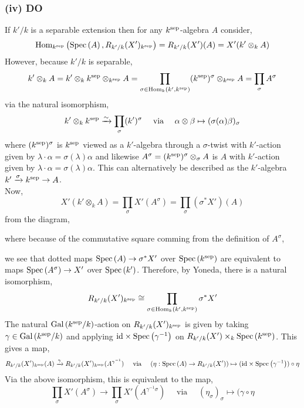 \documentclass[12pt]{article}
\begin{document}
\subsubsection{(iv) DO}

If $k'/k$ is a separable extension then for any $k^{\mathrm{sep}}$-algebra $A$ consider,
\[ \mathrm{Hom}_{k^{\mathrm{sep}}} \left( \mathrm{Spec}\left( A \right), R_{k'/k}(X')_{k^{\mathrm{sep}}} \right) = R_{k'/k}(X')(A) =  X'(k' \otimes_k A) \]
However, because $k'/k$ is separable,
\[ k' \otimes_k A = k' \otimes_k k^{\mathrm{sep}} \otimes_{k^{\mathrm{sep}}} A = \prod_{\sigma \in \mathrm{Hom}_{k} \left( k', k^{\mathrm{sep}} \right)} (k^{\mathrm{sep}})^\sigma \otimes_{k^{\mathrm{sep}}} A = \prod_{\sigma} A^\sigma \]
via the natural isomorphism,
\[ k' \otimes_k k^{\mathrm{sep}} \xrightarrow{\sim} \prod_{\sigma} (k')^\sigma \quad \text{ via } \quad \alpha \otimes \beta \mapsto (\sigma(\alpha) \beta)_\sigma \]
where $(k^{\mathrm{sep}})^\sigma$ is $k^{\mathrm{sep}}$ viewed as a $k'$-algebra through a $\sigma$-twist with $k'$-action given by $\lambda \cdot \alpha = \sigma(\lambda) \alpha$ and likewise $A^\sigma = (k^{\mathrm{sep}})^\sigma \otimes_\sigma A$ is $A$ with $k'$-action given by $\lambda \cdot \alpha = \sigma(\lambda)\alpha$. This can alternatively be described as the $k'$-algebra $k' \xrightarrow{\sigma} k^{\mathrm{sep}} \to A$.
\bigskip\\
Now,
\[ X'(k' \otimes_k A) = \prod_{\sigma} X'(A^\sigma) = \prod_{\sigma} (\sigma^* X')(A) \]
from the diagram,
\begin{center}
\end{center}
where because of the commutative square comming from the definition of $A^\sigma$,
\begin{center}
\end{center}
we see that dotted maps $\mathrm{Spec}\left( A \right) \to \sigma^* X'$ over $\mathrm{Spec}\left( k^{\mathrm{sep}} \right)$ are equivalent to maps $\mathrm{Spec}\left( A^\sigma \right) \to X'$ over $\mathrm{Spec}\left( k' \right)$. Therefore, by Yoneda, there is a natural isomorphism,
\[ R_{k'/k}(X')_{k^{\mathrm{sep}}} \cong \prod_{\sigma \in \mathrm{Hom}_{k} \left( k', k^{\mathrm{sep}} \right)} \sigma^* X' \]
The natural $\mathrm{Gal}\left( k^{\mathrm{sep}}/k \right)$-action on $R_{k'/k}(X')_{k^{\mathrm{sep}}}$ is given by taking $\gamma \in \mathrm{Gal}\left( k^{\mathrm{sep}}/k \right)$ and applying $\mathrm{id} \times \mathrm{Spec}\left( \gamma^{-1} \right)$ on $R_{k'/k}(X') \times_k \mathrm{Spec}\left( k^{\mathrm{sep}} \right)$. This gives a map,
\[ R_{k'/k}(X')_{k^{\mathrm{sep}}}(A) \xrightarrow{\gamma} R_{k'/k}(X')_{k^{\mathrm{sep}}}(A^{\gamma^{-1}}) \quad \text{ via } \quad (\eta : \mathrm{Spec}\left( A \right) \to R_{k'/k}(X')) \mapsto (\mathrm{id} \times \mathrm{Spec}\left( \gamma^{-1} \right)) \circ \eta \]
Via the above isomorphism, this is equivalent to the map,
\[ \prod_{\sigma} X'(A^\sigma) \to \prod_{\sigma} X'(A^{\gamma^{-1} \sigma}) \quad \text{ via } \quad (\eta_\sigma)_\sigma \mapsto (\gamma \circ \eta \]
\end{document}
